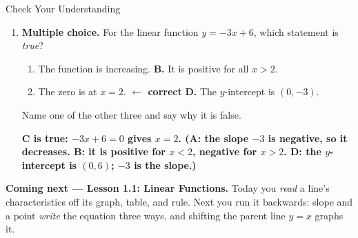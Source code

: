 \documentclass[12pt]{article}
\newcommand{\answerspace}[2]{\par\nopagebreak\noindent\begin{minipage}[t][#1][t]{\linewidth}%
  \color{keyred}\bfseries #2\end{minipage}\par}
\begin{document}
\begin{notesbox}{Check Your Understanding }
\begin{enumerate}[leftmargin=1.7em, itemsep=4pt]
  \item \textbf{Multiple choice.} For the linear function $y = -3x + 6$, which statement is
        \emph{true}?
    \begin{enumerate}[label=\Alph*., leftmargin=2.2em, itemsep=1pt]
      \item[\textbf{A.}] The function is increasing. \hfill
            \textbf{B.} It is positive for all $x > 2$.
      \item[\textbf{C.}] The zero is at $x = 2$. \textcolor{keyred}{\textbf{$\leftarrow$ correct}} \hfill
            \textbf{D.} The $y$-intercept is $(0,-3)$.
    \end{enumerate}
    Name one of the other three and say why it is false.
    \answerspace{1.4cm}{C is true: $-3x+6=0$ gives $x=2$. (A: the slope $-3$ is negative, so it decreases. B: it is positive for $x<2$, negative for $x>2$. D: the $y$-intercept is $(0,6)$; $-3$ is the slope.)}
\end{enumerate}
\end{notesbox}

\boxguard[6]
\begin{spiralbox}
\textbf{Coming next --- Lesson 1.1: Linear Functions.} Today you \emph{read} a line's characteristics
off its graph, table, and rule. Next you run it backwards: slope and a point \emph{write} the
equation three ways, and shifting the parent line $y=x$ graphs it.
\end{spiralbox}
\end{document}
